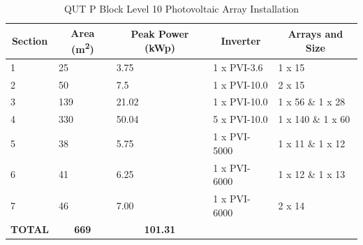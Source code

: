 \begin{table}[H]
	\centering
	\begin{tabular}{|l|l|l|l|l|}
		\hline
		\multicolumn{1}{|c|}{\textbf{Section}} & \multicolumn{1}{c|}{\textbf{Area (\si{m^2})}} & \multicolumn{1}{c|}{\textbf{Peak Power (kWp)}} & \multicolumn{1}{c|}{\textbf{Inverter}} & \multicolumn{1}{c|}{\textbf{Arrays and Size}} \\ \hline
		1                                      & 25                                 & 3.75                                           & 1 x PVI-3.6                            & 1 x 15                                        \\ \hline
		2                                      & 50                                 & 7.5                                            & 1 x PVI-10.0                           & 2 x 15                                        \\ \hline
		3                                      & 139                                & 21.02                                          & 1 x PVI-10.0                           & 1 x 56 \& 1 x 28                              \\ \hline
		4                                      & 330                                & 50.04                                          & 5 x PVI-10.0                           & 1 x 140 \& 1 x 60                             \\ \hline
		5                                      & 38                                 & 5.75                                           & 1 x PVI-5000                           & 1 x 11 \& 1 x 12                              \\ \hline
		6                                      & 41                                 & 6.25                                           & 1 x PVI-6000                           & 1 x 12 \& 1 x 13                              \\ \hline
		7                                      & 46                                 & 7.00                                           & 1 x PVI-6000                           & 2 x 14                                        \\ \hline
		\multicolumn{1}{|c|}{\textbf{TOTAL}}   & \multicolumn{1}{c|}{\textbf{669}}  & \multicolumn{1}{c|}{\textbf{101.31}}           &                                        &                                               \\ \hline
	\end{tabular}
\caption{QUT P Block Level 10 Photovoltaic Array Installation}
\label{table:qut-pblock-lvl10-pv-breakdown}
\end{table}

